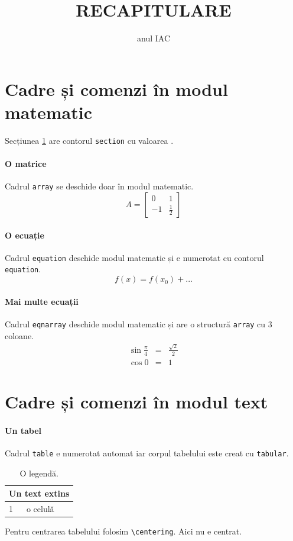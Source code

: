 \documentclass{article}
\title{RECAPITULARE}
\author{anul IAC}
\begin{document}
\maketitle
\section{Cadre și comenzi în modul matematic}\label{mat}
Secțiunea \ref{mat} are contorul \verb+section+ cu valoarea \thesection.
\paragraph{O matrice}
Cadrul \verb+array+ se deschide doar în modul matematic.
$$
A=\left[
\begin{array}{rr}
0&1\\
-1&\frac{1}{2}
\end{array}
\right]
$$
\paragraph{O ecuație}
Cadrul \verb+equation+  deschide modul matematic și e numerotat cu contorul \verb+equation+.
\begin{equation}
f(x)=f(x_{0})+...
\end{equation}
\paragraph{Mai multe ecuații}
Cadrul \verb+eqnarray+ deschide modul matematic și are o structură \verb+array+ cu 3 coloane.
\begin{eqnarray}
\sin \frac{\pi}{4}&=&\frac{\sqrt{2}}{2}\\
\cos 0&=&1
\end{eqnarray}
\section{Cadre și comenzi în modul text}
\paragraph{Un tabel}
Cadrul \verb+table+ e numerotat automat iar corpul tabelului este creat cu \verb+tabular+.
\begin{table}[htpb]
\begin{tabular}{ll}
\multicolumn{2}{c}{Un text extins}\\\hline
1&o celulă\\\hline
\end{tabular}
\caption{O legendă.}\label{tab:tab}
\end{table}
Pentru centrarea tabelului folosim \verb+\centering+. Aici nu e centrat.
\end{document}
